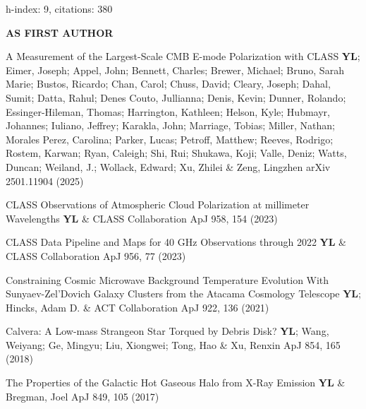 \hfill\textmd{h-index: 9, citations: 380}
\begin{footnotesize}
    \textsf{\textbf{ AS FIRST AUTHOR }}
\end{footnotesize}
\begin{etaremune}[topsep=0pt,itemsep=0pt,partopsep=0pt,parsep=0pt]
    \renewcommand\labelenumi{\footnotesize\bfseries\theenumi.}
    
            {A Measurement of the Largest-Scale CMB E-mode Polarization with CLASS}
            {\textbf{YL}; Eimer, Joseph; Appel, John; Bennett, Charles; Brewer, Michael; Bruno, Sarah Marie; Bustos, Ricardo; Chan, Carol; Chuss, David; Cleary, Joseph; Dahal, Sumit; Datta, Rahul; Denes Couto, Jullianna; Denis, Kevin; Dunner, Rolando; Essinger-Hileman, Thomas; Harrington, Kathleen; Helson, Kyle; Hubmayr, Johannes; Iuliano, Jeffrey; Karakla, John; Marriage, Tobias; Miller, Nathan; Morales Perez, Carolina; Parker, Lucas; Petroff, Matthew; Reeves, Rodrigo; Rostem, Karwan; Ryan, Caleigh; Shi, Rui; Shukawa, Koji; Valle, Deniz; Watts, Duncan; Weiland, J.; Wollack, Edward; Xu, Zhilei \& Zeng, Lingzhen}
            {arXiv 2501.11904 (2025)}
    
            {CLASS Observations of Atmospheric Cloud Polarization at millimeter Wavelengths}
            {\textbf{YL} \& CLASS Collaboration}
            {ApJ 958, 154 (2023)}
    
            {CLASS Data Pipeline and Maps for 40 GHz Observations through 2022}
            {\textbf{YL} \& CLASS Collaboration}
            {ApJ 956, 77 (2023)}
    
            {Constraining Cosmic Microwave Background Temperature Evolution With Sunyaev-Zel'Dovich Galaxy Clusters from the Atacama Cosmology Telescope}
            {\textbf{YL}; Hincks, Adam D. \& ACT Collaboration}
            {ApJ 922, 136 (2021)}
    
            {Calvera: A Low-mass Strangeon Star Torqued by Debris Disk?}
            {\textbf{YL}; Wang, Weiyang; Ge, Mingyu; Liu, Xiongwei; Tong, Hao \& Xu, Renxin}
            {ApJ 854, 165 (2018)}
    
            {The Properties of the Galactic Hot Gaseous Halo from X-Ray Emission}
            {\textbf{YL} \& Bregman, Joel}
            {ApJ 849, 105 (2017)}
    
\end{etaremune}
